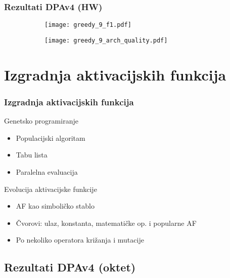 \documentclass{beamer}
\begin{document}
\begin{frame}
\frametitle{Rezultati DPAv4 (HW)}

\begin{figure}
\centering
\begin{subfigure}{.48\textwidth}
  \centering
  \texttt{[image: greedy\_9\_f1.pdf]}
\end{subfigure}
\begin{subfigure}{.5\textwidth}
  \centering
  \texttt{[image: greedy\_9\_arch\_quality.pdf]}
\end{subfigure}
\end{figure}

\end{frame}

\section{Izgradnja aktivacijskih funkcija}

\begin{frame}
\frametitle{Izgradnja aktivacijskih funkcija}

Genetsko programiranje

\begin{itemize}
\item Populacijski algoritam
\item Tabu lista
\item Paralelna evaluacija
\end{itemize}

Evolucija aktivacijske funkcije

\begin{itemize}
\item AF kao simboličko stablo
\item Čvorovi: ulaz, konstanta, matematičke op. i popularne AF
\item Po nekoliko operatora križanja i mutacije
\end{itemize}

\end{frame}

\subsection{Rezultati DPAv4 (oktet)}
\end{document}
